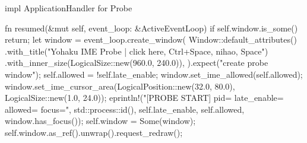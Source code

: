 impl ApplicationHandler for Probe {
    fn resumed(&mut self, event_loop: &ActiveEventLoop) {
        if self.window.is_some() {
            return;
        }
        let window = event_loop.create_window(
            Window::default_attributes()
                .with_title("Yohaku IME Probe | click here, Ctrl+Space, nihao, Space")
                .with_inner_size(LogicalSize::new(960.0, 240.0)),
        ).expect("create probe window");
        self.allowed = !self.late_enable;
        window.set_ime_allowed(self.allowed);
        window.set_ime_cursor_area(LogicalPosition::new(32.0, 80.0), LogicalSize::new(1.0, 24.0));
        eprintln!("[PROBE START] pid={} late_enable={} allowed={} focus={}",
                  std::process::id(), self.late_enable, self.allowed, window.has_focus());
        self.window = Some(window);
        self.window.as_ref().unwrap().request_redraw();
    }

}
